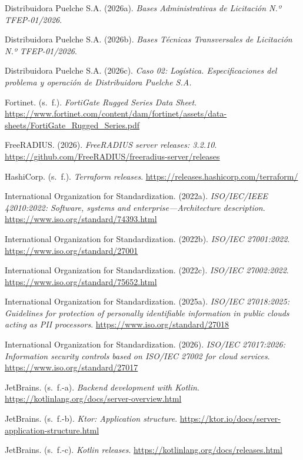 \begin{list}{}{\setlength{\leftmargin}{1.27cm}\setlength{\itemindent}{-1.27cm}\setlength{\itemsep}{0.5\baselineskip}\raggedright}
\item Distribuidora Puelche S.A. (2026a). \textit{Bases Administrativas de Licitación N.º TFEP-01/2026}.
\item Distribuidora Puelche S.A. (2026b). \textit{Bases Técnicas Transversales de Licitación N.º TFEP-01/2026}.
\item Distribuidora Puelche S.A. (2026c). \textit{Caso 02: Logística. Especificaciones del problema y operación de Distribuidora Puelche S.A.}
\item Fortinet. (s.~f.). \textit{FortiGate Rugged Series Data Sheet}. \url{https://www.fortinet.com/content/dam/fortinet/assets/data-sheets/FortiGate_Rugged_Series.pdf}
\item FreeRADIUS. (2026). \textit{FreeRADIUS server releases: 3.2.10}. \url{https://github.com/FreeRADIUS/freeradius-server/releases}
\item HashiCorp. (s.~f.). \textit{Terraform releases}. \url{https://releases.hashicorp.com/terraform/}
\item International Organization for Standardization. (2022a). \textit{ISO/IEC/IEEE 42010:2022: Software, systems and enterprise---Architecture description}. \url{https://www.iso.org/standard/74393.html}
\item International Organization for Standardization. (2022b). \textit{ISO/IEC 27001:2022}. \url{https://www.iso.org/standard/27001}
\item International Organization for Standardization. (2022c). \textit{ISO/IEC 27002:2022}. \url{https://www.iso.org/standard/75652.html}
\item International Organization for Standardization. (2025a). \textit{ISO/IEC 27018:2025: Guidelines for protection of personally identifiable information in public clouds acting as PII processors}. \url{https://www.iso.org/standard/27018}
\item International Organization for Standardization. (2026). \textit{ISO/IEC 27017:2026: Information security controls based on ISO/IEC 27002 for cloud services}. \url{https://www.iso.org/standard/27017}
\item JetBrains. (s.~f.-a). \textit{Backend development with Kotlin}. \url{https://kotlinlang.org/docs/server-overview.html}
\item JetBrains. (s.~f.-b). \textit{Ktor: Application structure}. \url{https://ktor.io/docs/server-application-structure.html}
\item JetBrains. (s.~f.-c). \textit{Kotlin releases}. \url{https://kotlinlang.org/docs/releases.html}

\end{list}

